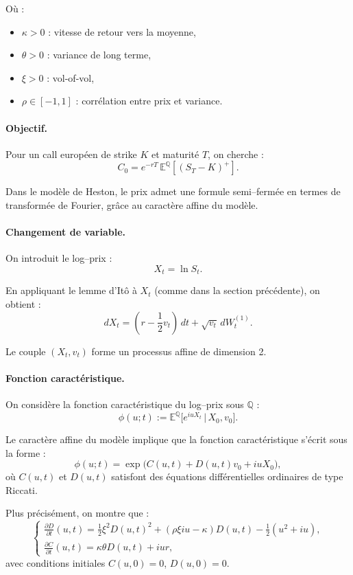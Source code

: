 \documentclass[11pt,a4paper]{article}
\newcommand{\1}{\mathbf{1}}
\begin{document}
O\`u :
\begin{itemize}
  \item $\kappa > 0$ : vitesse de retour vers la moyenne,
  \item $\theta > 0$ : variance de long terme,
  \item $\xi > 0$ : vol-of-vol,
  \item $\rho \in [-1,1]$ : corr\'elation entre prix et variance.
\end{itemize}

\paragraph{Objectif.}

Pour un call europ\'een de strike $K$ et maturit\'e $T$, on cherche :
\[
C_0 = e^{-rT}\,\mathbb{E}^{\mathbb{Q}}[(S_T - K)^+].
\]

Dans le mod\`ele de Heston, le prix admet une formule semi--ferm\'ee en termes de
transform\'ee de Fourier, gr\^ace au caract\`ere affine du mod\`ele.

\paragraph{Changement de variable.}

On introduit le log--prix :
\[
X_t = \ln S_t.
\]

En appliquant le lemme d'It\^{o} \`a $X_t$ (comme dans la section pr\'ec\'edente), on obtient :
\[
dX_t = \left(r - \frac12 v_t\right)\, dt + \sqrt{v_t} \, dW_t^{(1)}.
\]

Le couple $(X_t,v_t)$ forme un processus affine de dimension 2.

\paragraph{Fonction caract\'eristique.}

On consid\`ere la fonction caract\'eristique du log--prix sous $\mathbb{Q}$ :
\[
\phi(u; t) := \mathbb{E}^{\mathbb{Q}}\big[ e^{iu X_t} \,\big|\, X_0, v_0 \big].
\]

Le caract\`ere affine du mod\`ele implique que la fonction caract\'eristique s'\'ecrit sous la forme :
\[
\phi(u; t) =
\exp\Big( C(u,t) + D(u,t) v_0 + iu X_0 \Big),
\]
o\`u $C(u,t)$ et $D(u,t)$ satisfont des \'{e}quations diff\'erentielles ordinaires de type Riccati.

Plus pr\'ecis\'ement, on montre que :
\[
\begin{cases}
\displaystyle \frac{\partial D}{\partial t}(u,t)
= \frac12 \xi^2 D(u,t)^2 + (\rho \xi iu - \kappa) D(u,t) - \frac12 (u^2 + iu), \\[8pt]
\displaystyle \frac{\partial C}{\partial t}(u,t)
= \kappa \theta D(u,t) + i u r,
\end{cases}
\]
avec conditions initiales $C(u,0)=0$, $D(u,0)=0$.
\end{document}
